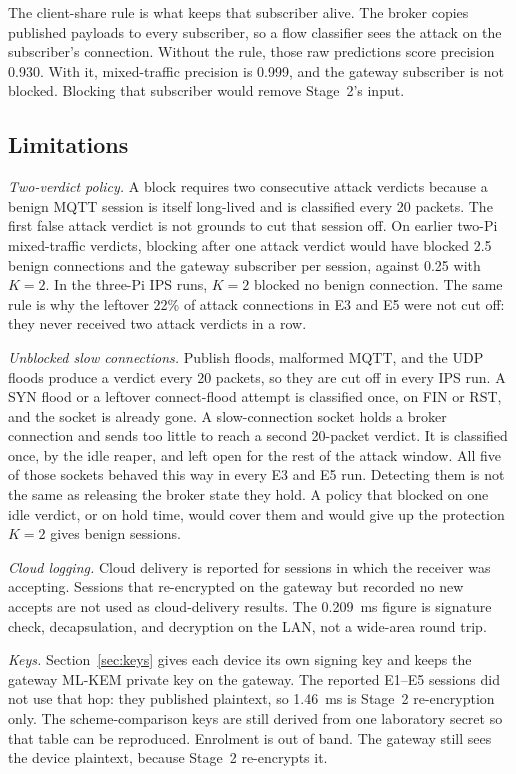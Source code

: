 \documentclass[journal]{IEEEtran}
\begin{document}
The client-share rule is what keeps that subscriber alive. The broker copies published payloads to every subscriber, so a flow classifier sees the attack on the subscriber's connection. Without the rule, those raw predictions score precision 0.930. With it, mixed-traffic precision is 0.999, and the gateway subscriber is not blocked. Blocking that subscriber would remove Stage~2's input.

\subsection{Limitations}
\label{sec:limits}

\textit{Two-verdict policy.} A block requires two consecutive attack verdicts because a benign MQTT session is itself long-lived and is classified every 20 packets. The first false attack verdict is not grounds to cut that session off. On earlier two-Pi mixed-traffic verdicts, blocking after one attack verdict would have blocked 2.5 benign connections and the gateway subscriber per session, against 0.25 with $K = 2$. In the three-Pi IPS runs, $K = 2$ blocked no benign connection. The same rule is why the leftover 22\% of attack connections in E3 and E5 were not cut off: they never received two attack verdicts in a row.

\textit{Unblocked slow connections.} Publish floods, malformed MQTT, and the UDP floods produce a verdict every 20 packets, so they are cut off in every IPS run. A SYN flood or a leftover connect-flood attempt is classified once, on FIN or RST, and the socket is already gone. A slow-connection socket holds a broker connection and sends too little to reach a second 20-packet verdict. It is classified once, by the idle reaper, and left open for the rest of the attack window. All five of those sockets behaved this way in every E3 and E5 run. Detecting them is not the same as releasing the broker state they hold. A policy that blocked on one idle verdict, or on hold time, would cover them and would give up the protection $K = 2$ gives benign sessions.

\textit{Cloud logging.} Cloud delivery is reported for sessions in which the receiver was accepting. Sessions that re-encrypted on the gateway but recorded no new accepts are not used as cloud-delivery results. The 0.209~ms figure is signature check, decapsulation, and decryption on the LAN, not a wide-area round trip.

\textit{Keys.} Section~\ref{sec:keys} gives each device its own signing key and keeps the gateway ML-KEM private key on the gateway. The reported E1--E5 sessions did not use that hop: they published plaintext, so 1.46~ms is Stage~2 re-encryption only. The scheme-comparison keys are still derived from one laboratory secret so that table can be reproduced. Enrolment is out of band. The gateway still sees the device plaintext, because Stage~2 re-encrypts it.
\end{document}
